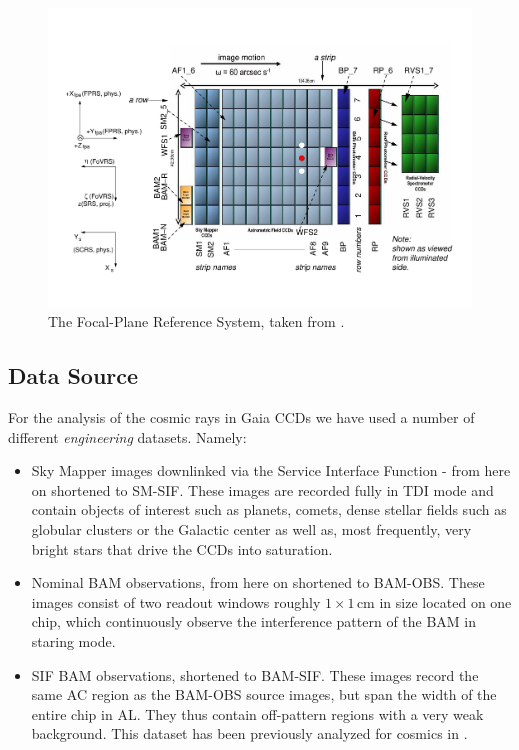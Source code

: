\documentclass[a4paper, 11pt]{article}
\begin{document}
\begin{figure}[h!]
  \centering
  \includegraphics[width=\textwidth]{images/astro-focal-plane-v5-alex-short}
  \caption{The Focal-Plane Reference System, taken from \cite{GAIA-CA-SP-ARI-BAS-003}.}
  \label{fig:focal_plane}
\end{figure}

\subsection{Data Source}

For the analysis of the cosmic rays in Gaia CCDs we have used a number of different \textit{engineering} datasets. Namely:  
\begin{itemize}
  \item Sky Mapper images downlinked via the Service Interface Function - from here on shortened to SM-SIF. These images are recorded fully in TDI mode and contain objects of interest such as planets, comets, dense stellar fields such as globular clusters or the Galactic center as well as, most frequently, very bright stars that drive the CCDs into saturation.
  \item Nominal BAM observations, from here on shortened to BAM-OBS. These images consist of two readout windows roughly $1 \times 1\, \mathrm{cm}$ in size located on one chip, which continuously observe the interference pattern of the BAM in staring mode.
  \item SIF BAM observations, shortened to BAM-SIF. These images record the same AC region as the BAM-OBS source images, but span the width of the entire chip in AL. They thus contain off-pattern regions with a very weak background. This dataset has been previously analyzed for cosmics in \cite{GAIA-DE-TN-ESAC-RKO-033}.
\end{itemize}
\end{document}
